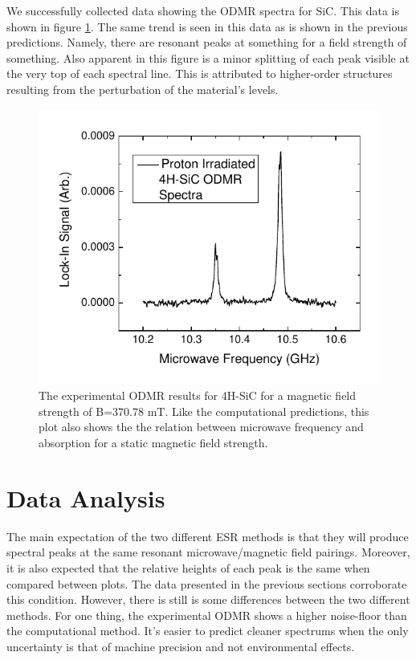 \documentclass[oneside, astronomy, noacknowlegments]{BYUPhys}
\begin{document}
We successfully collected data showing the ODMR spectra for SiC. This data is shown in figure \ref{fig:SiCResults}. The same trend is seen in this data as is shown in the previous predictions. Namely, there are resonant peaks at something for a field strength of something. Also apparent in this figure is a minor splitting of each peak visible at the very top of each spectral line. This is attributed to higher-order structures resulting from the perturbation of the material's levels.

\begin{figure}
    \centerline{\includegraphics{p14-odmr}}
    \caption[Experimental ODMR for SiC]{\label{fig:SiCResults}
     The experimental ODMR results for 4H-SiC for a magnetic field strength of B=370.78 mT. Like the computational predictions, this plot also shows the the relation between microwave frequency and absorption for a static magnetic field strength.}
 \end{figure}
 
\section{Data Analysis}

The main expectation of the two different ESR methods is that they will produce spectral peaks at the same resonant microwave/magnetic field pairings. Moreover, it is also expected that the relative heights of each peak is the same when compared between plots. The data presented in the previous sections corroborate this condition. However, there is still is some differences between the two different methods. For one thing, the experimental ODMR shows a higher noise-floor than the computational method. It's easier to predict cleaner spectrums when the only uncertainty is that of machine precision and not environmental effects.
\end{document}
